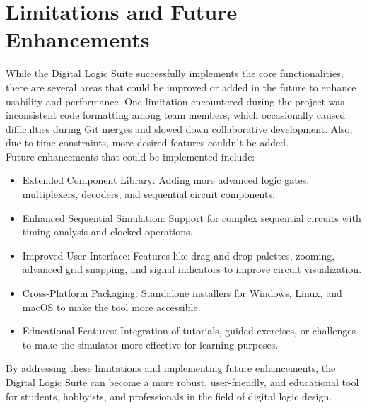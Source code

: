 \section{Limitations and Future Enhancements}
While the Digital Logic Suite successfully implements the core functionalities, there are several areas that could be improved or added in the future to enhance usability and performance. One limitation encountered during the project was inconsistent code formatting among team members, which occasionally caused difficulties during Git merges and slowed down collaborative development. Also, due to time constraints, more desired features couldn't be added.\\
Future enhancements that could be implemented include:
\begin{itemize}
    \item Extended Component Library: Adding more advanced logic gates, multiplexers, decoders, and sequential circuit components.
    \item Enhanced Sequential Simulation: Support for complex sequential circuits with timing analysis and clocked operations.
    \item Improved User Interface: Features like drag-and-drop palettes, zooming, advanced grid snapping, and signal indicators to improve circuit visualization.
    \item Cross-Platform Packaging: Standalone installers for Windows, Linux, and macOS to make the tool more accessible.
    \item Educational Features: Integration of tutorials, guided exercises, or challenges to make the simulator more effective for learning purposes.
\end{itemize}

\vspace{0.5cm}
By addressing these limitations and implementing future enhancements, the Digital Logic Suite can become a more robust, user-friendly, and educational tool for students, hobbyists, and professionals in the field of digital logic design.
\clearpage